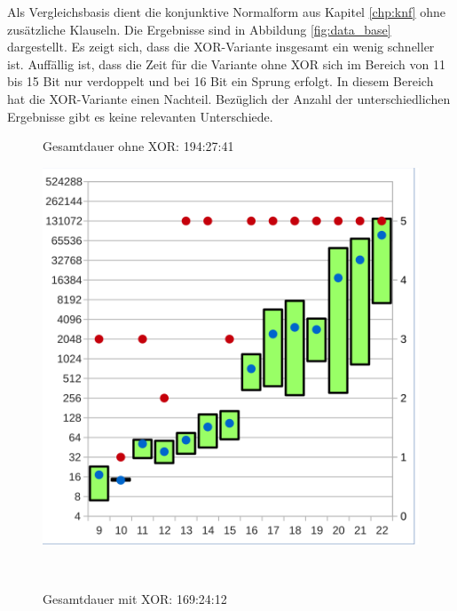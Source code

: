 Als Vergleichsbasis dient die konjunktive Normalform aus Kapitel \ref{chp:knf} ohne zusätzliche Klauseln. Die Ergebnisse sind in
Abbildung \ref{fig:data_base} dargestellt. Es zeigt sich, dass die XOR-Variante insgesamt ein wenig schneller ist. Auffällig ist,
dass die Zeit für die Variante ohne XOR sich im Bereich von 11 bis 15 Bit nur verdoppelt und bei 16 Bit ein Sprung erfolgt. In
diesem Bereich hat die XOR-Variante einen Nachteil. Bezüglich der Anzahl der unterschiedlichen Ergebnisse gibt es keine relevanten
Unterschiede.
\begin{figure}[!h]
  \centering
  \begin{minipage}[t]{0.45\textwidth}
  \begin{flushleft}Gesamtdauer ohne XOR: 194:27:41\end{flushleft}
  \includegraphics[scale=0.55]{images/data_base_knf}
  \end{minipage}
  \begin{minipage}[t]{0.09\textwidth}
  ~~
  \end{minipage}
  \begin{minipage}[t]{0.45\textwidth}
  \begin{flushleft}Gesamtdauer mit XOR: 169:24:12\end{flushleft}

\end{minipage}
\end{figure}
